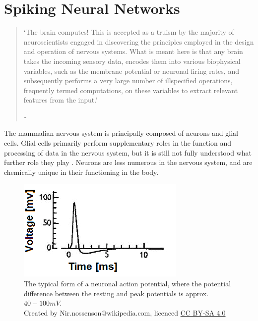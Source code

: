 \section{Spiking Neural Networks}

\begin{quote}
    `The brain computes! This is accepted as a truism by the majority
    of neuroscientists engaged in discovering the principles employed in the
    design and operation of nervous systems. What is meant here is that any
    brain takes the incoming sensory data, encodes them into various biophysical
    variables, such as the membrane potential or neuronal firing rates, and
    subsequently performs a very large number of illspecified operations,
    frequently termed computations, on these variables to extract relevant
    features from the input.'
    \begin{flushright}
        \textit{-\autocite{koch_biophysics_2004}}
    \end{flushright}
\end{quote}

The mammalian nervous system is principally composed of neurons and glial cells.
Glial cells primarily perform supplementary roles in the function and processing
of data in the nervous system, but it is still not fully understood what further
role they play \autocite{walz_role_1989}. Neurons are less numerous in the
nervous system, and are chemically unique in their functioning in the body.

\begin{figure}[t]
    \centering
    \includegraphics{figures/graphs/huxhog_spike.png}
    \caption[The typical form of a neuronal action potential]{The typical form
    of a neuronal action potential, where the potential difference between the
    resting and peak potentials is approx. $40-100 mV$.
        \\\small{Created by
    Nir.nossenson@wikipedia.com, licenced 
            \href{https://creativecommons.org/licenses/by-sa/4.0/deed.en}{CC BY-SA 4.0}}}
    \label{neuronalactionpotentialexample}
\end{figure}
\vspace{1ex}

